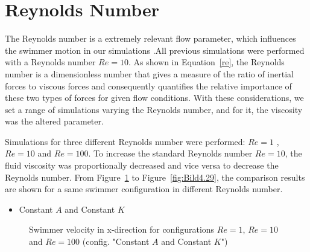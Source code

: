 \section{Reynolds Number}
\label{sec:section 6}

The Reynolds number is a extremely relevant flow parameter, which influences the swimmer motion in our simulations .All previous simulations were performed with a Reynolds number
$Re= 10$. As shown in Equation~\ref{re}, the Reynolds number is a dimensionless number that gives a measure of the ratio of inertial forces to viscous forces and consequently
quantifies the relative importance of these two types of forces for given flow conditions. With these considerations, we set a range of simulations varying the Reynolds number,
and for it, the viscosity was the altered parameter.\par

Simulations for three different Reynolds number were performed: $Re=1$ , $Re=10$ and $Re=100$. To increase the standard Reynolds number $Re=10$, the fluid viscosity was proportionally
decreased and vice versa to decrease the Reynolds number. From Figure~\ref{fig:Bild4.24} to Figure~\ref{fig:Bild4.29}, the comparison results are shown for a same swimmer configuration
in different Reynolds number.  



\begin{itemize}
  \item Constant $A$ and Constant $K$
\end{itemize}


\begin{figure}[H]
\centering
  \begin{footnotesize}
  
  \caption[Swimmer velocity in x-direction for configurations $Re=1$, $Re=10$ and $Re=100$ (config. "Constant $A$ and Constant $K$") ]{Swimmer velocity in x-direction for configurations $Re=1$, $Re=10$ and $Re=100$ (config. "Constant $A$ and Constant $K$")}
   \label{fig:Bild4.24}
  \end{footnotesize}
\end{figure}


